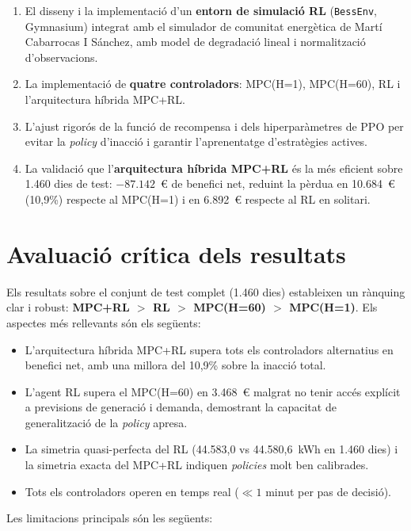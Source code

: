 \documentclass[a4paper,12pt,twoside]{ThesisStyle}
\begin{document}
\begin{enumerate}
    \item El disseny i la implementació d'un \textbf{entorn de simulació RL} (\texttt{BessEnv}, Gymnasium) integrat amb el simulador de comunitat energètica de Martí Cabarrocas I Sánchez, amb model de degradació lineal i normalització d'observacions.
    \item La implementació de \textbf{quatre controladors}: MPC(H=1),  MPC(H=60), RL i l'arquitectura híbrida MPC+RL.
    \item L'ajust rigorós de la funció de recompensa i dels hiperparàmetres de PPO per evitar la \textit{policy} d'inacció i garantir l'aprenentatge d'estratègies actives.
    \item La validació que l'\textbf{arquitectura híbrida MPC+RL} és la més eficient sobre 1.460 dies de test: $-87.142$~€ de benefici net, reduint la pèrdua en 10.684~€ (10,9\%) respecte al MPC(H=1) i en 6.892~€ respecte al RL en solitari.
\end{enumerate}

\section{Avaluació crítica dels resultats}

Els resultats sobre el conjunt de test complet (1.460 dies) estableixen un rànquing clar i robust: \textbf{MPC+RL $>$ RL $>$ MPC(H=60) $>$ MPC(H=1)}. Els aspectes més rellevants són els següents:

\begin{itemize}
    \item L'arquitectura híbrida MPC+RL supera tots els controladors alternatius en benefici net, amb una millora del 10,9\% sobre la inacció total.
    \item L'agent RL supera el MPC(H=60) en 3.468~€ malgrat no tenir accés explícit a previsions de generació i demanda, demostrant la capacitat de generalització de la \textit{policy} apresa.
    \item La simetria quasi-perfecta del RL (44.583,0 vs 44.580,6~kWh en 1.460 dies) i la simetria exacta del MPC+RL indiquen \textit{policies} molt ben calibrades.
    \item Tots els controladors operen en temps real ($\ll 1$ minut per pas de decisió).
\end{itemize}

Les limitacions principals són les següents:
\end{document}
